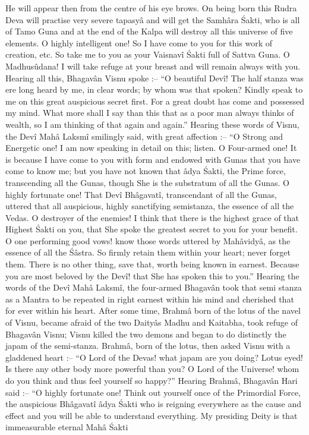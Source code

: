 He will appear then from the centre of his eye brows. On being born this Rudra Deva will practise very severe tapasy\^a and will get the Samh\^ara \'Sakti, who is all of Tamo Guna and at the end of the Kalpa will destroy all this universe of five elements. O highly intelligent one! So I have come to you for this work of creation, etc. So take me to you as your Vaisnav\^i \'Sakti full of Sattva Guna. O Madhus\^udana! I will take refuge at your breast and will remain always with you. Hearing all this, Bhagav\^an Visnu spoke :-- ``O beautiful Dev\^i! The half stanza was ere long heard by me, in clear words; by whom was that spoken? Kindly speak to me on this great auspicious secret first. For a great doubt has come and possessed my mind. What more shall I say than this that as a poor man always thinks of wealth, so I am thinking of that again and again.'' Hearing these words of Visnu, the Dev\^i Mah\^a Laksm\^i smilingly said, with great affection :-- ``O Strong and Energetic one! I am now speaking in detail on this; listen. O Four-armed one! It is because I have come to you with form and endowed with Gunas that you have come to know me; but you have not known that \^adya \'Sakti, the Prime force, transcending all the Gunas, though She is the substratum of all the Gunas. O highly fortunate one! That Dev\^i Bh\^agavat\^i, transcendant of all the Gunas, uttered that all auspicious, highly sanctifying semistanza, the essence of all the Vedas. O destroyer of the enemies! I think that there is the highest grace of that Highest \'Sakti on you, that She spoke the greatest secret to you for your benefit. O one performing good vows! know those words uttered by Mah\^avidy\^a, as the essence of all the \'S\^astra. So firmly retain them within your heart; never forget them. There is no other thing, save that, worth being known in earnest. Because you are most beloved by the Dev\^i! that She has spoken this to you.'' Hearing the words of the Dev\^i Mah\^a Laksm\^i, the four-armed Bhagav\^an took that semi stanza as a Mantra to be repeated in right earnest within his mind and cherished that for ever within his heart. After some time, Brahm\^a born of the lotus of the navel of Visnu, became afraid of the two Daity\^as Madhu and Kaitabha, took refuge of Bhagav\^an Visnu; Visnu killed the two demons and began to do distinctly the japam of the semi-stanza. Brahm\^a, born of the lotus, then asked Visnu with a gladdened heart :-- ``O Lord of the Devas! what japam are you doing? Lotus eyed! Is there any other body more powerful than you? O Lord of the Universe! whom do you think and thus feel yourself so happy?'' Hearing Brahm\^a, Bhagav\^an Hari said :-- ``O highly fortunate one! Think out yourself once of the Primordial Force, the auspicious Bh\^agavat\^i \^adya \'Sakti who is reigning everywhere as the cause and effect and you will be able to understand everything. My presiding Deity is that immeasurable eternal Mah\^a \'Sakti

